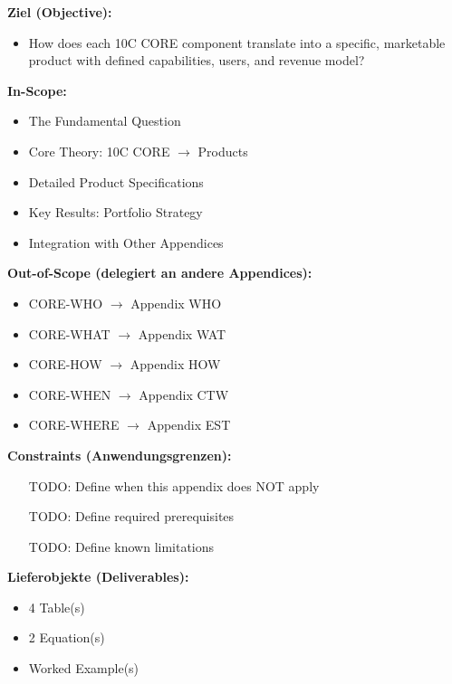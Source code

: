 \begin{tcolorbox}[
    colback=orange!5!white,
    colframe=orange!75!black,
    title={\textbf{Appendix Scope: Ziel / In-Scope / Out-of-Scope / Constraints}},
    fonttitle=\bfseries
]

\textbf{Ziel (Objective):}
\begin{itemize}[nosep]
    \item How does each 10C CORE component translate into a specific, marketable product with defined capabilities, users, and revenue model?
\end{itemize}

\textbf{In-Scope:}
\begin{itemize}[nosep]
    \item The Fundamental Question
    \item Core Theory: 10C CORE $\to$ Products
    \item Detailed Product Specifications
    \item Key Results: Portfolio Strategy
    \item Integration with Other Appendices
\end{itemize}

\textbf{Out-of-Scope (delegiert an andere Appendices):}
\begin{itemize}[nosep]
    \item CORE-WHO $\rightarrow$ Appendix WHO
    \item CORE-WHAT $\rightarrow$ Appendix WAT
    \item CORE-HOW $\rightarrow$ Appendix HOW
    \item CORE-WHEN $\rightarrow$ Appendix CTW
    \item CORE-WHERE $\rightarrow$ Appendix EST
\end{itemize}

\textbf{Constraints (Anwendungsgrenzen):}
\begin{itemize}[nosep]
    \item [TODO: Define when this appendix does NOT apply]
    \item [TODO: Define required prerequisites]
    \item [TODO: Define known limitations]
\end{itemize}

\textbf{Lieferobjekte (Deliverables):}
\begin{itemize}[nosep]
    \item 4 Table(s)
    \item 2 Equation(s)
    \item Worked Example(s)
\end{itemize}

\end{tcolorbox}




